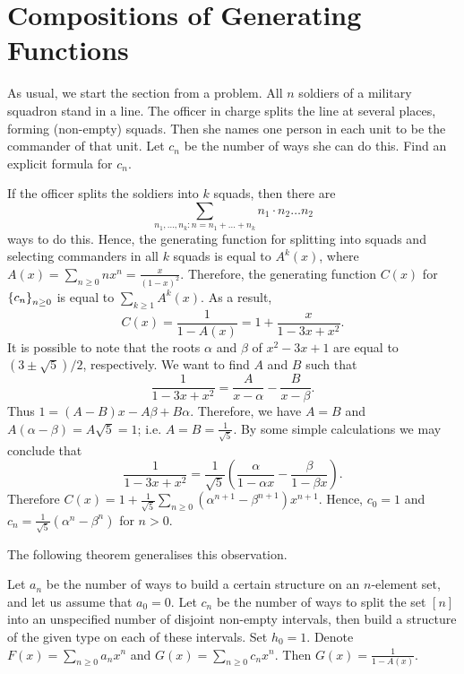 \section{Compositions of Generating Functions}
As usual, we start the section from a problem.
All $n$ soldiers of a military squadron stand in a line. The officer in charge
splits the line at several places, forming (non-empty) squads. Then she names
one person in each unit to be the commander of that unit. Let $c_n$ be the
number of ways she can do this. Find an explicit formula for $c_n$.

If the officer splits the soldiers into $k$ squads, then there
are
\[
  \sum_{n_1, \dots, n_k : n = n_1 + \dots + n_k} n_1 \cdot n_2 \dots n_2
\]
ways to do this. Hence, the generating function for splitting into squads and
selecting commanders in all $k$ squads is equal to $A^k(x)$, where
$A(x) = \sum_{n \ge 0} n x^n = \frac{x}{(1 - x)^2}$. Therefore,
the generating function $C(x)$ for $\set{c_n}_{n \ge 0}$ is equal to
$\sum_{k \ge 1} A^k(x)$. As a result,
\[
  C(x) = \frac{1}{1 - A(x)} = 1 + \frac{x}{1 - 3x + x^2}.
\]
It is possible to note that the roots $\alpha$ and $\beta$ of $x^2 - 3x + 1$ are
equal to $(3 \pm \sqrt{5}) / 2$, respectively. We want to find $A$ and $B$ such
that
\[
  \frac{1}{1 - 3x + x^2} = \frac{A}{x - \alpha} - \frac{B}{x - \beta}.
\]
Thus $1 = (A - B) x - A\beta + B\alpha$. Therefore, we have
$A = B$ and $A(\alpha - \beta) = A\sqrt{5} = 1$; i.e.
$A = B = \frac{1}{\sqrt{5}}$.
By some simple calculations we may conclude that
\[
  \frac{1}{1 - 3x + x^2} =
  \frac{1}{\sqrt{5}}(\frac{\alpha}{1 - \alpha x} - \frac{\beta}{1 - \beta x}).
\]
Therefore
$C(x) = 1 + \frac{1}{\sqrt{5}}
  \sum_{n \ge 0} (\alpha^{n + 1} - \beta^{n + 1}) x^{n + 1}$.
Hence, $c_0 = 1$ and $c_n = \frac{1}{\sqrt{5}}(\alpha^n - \beta^n)$ for $n > 0$.

The following theorem generalises this observation.
\begin{theorem}
  Let $a_n$ be the number of ways to build a certain structure on an $n$-element
  set, and let us assume that $a_0 = 0$. Let $c_n$ be the number of ways to
  split the set $[n]$ into an unspecified number of disjoint non-empty
  intervals, then build a structure of the given type on each of these
  intervals. Set $h_0 = 1$. Denote $F(x) = \sum_{n \ge 0} a_n x^n$ and
  $G(x) = \sum_{n \ge 0} c_n x^n$. Then $G(x) = \frac{1}{1 - A(x)}$.
\end{theorem}

